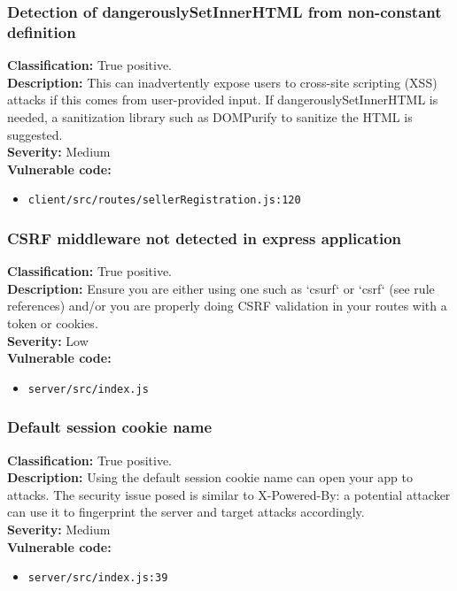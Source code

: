 \documentclass[]{article}
\begin{document}
\subsubsection{Detection of dangerouslySetInnerHTML from non-constant definition}
\textbf{Classification:} {True positive.} \\
\textbf{Description:} This can inadvertently expose users to cross-site scripting (XSS) attacks if this comes from user-provided input. If dangerouslySetInnerHTML is needed, a sanitization library such as DOMPurify to sanitize the HTML is suggested. \\ 
\textbf{Severity:}  Medium \\ 
\textbf{Vulnerable code:}
\begin{itemize}
    \item \texttt{client/src/routes/sellerRegistration.js:120}
\end{itemize}

\subsubsection{CSRF middleware not detected in express application}
\textbf{Classification:} {True positive.} \\
\textbf{Description:}  Ensure you are either using one such
          as `csurf` or `csrf` (see rule references) and/or you are properly doing CSRF validation in your    
          routes with a token or cookies.\\ 
\textbf{Severity:}  Low \\ 
\textbf{Vulnerable code:}
\begin{itemize}
    \item \texttt{server/src/index.js}
\end{itemize}


\subsubsection{Default session cookie name}
\textbf{Classification:} {True positive.} \\
\textbf{Description:} Using the default session cookie name can open your app to
          attacks. The security issue posed is similar to X-Powered-By: a potential attacker can use it to    
          fingerprint the server and target attacks accordingly. \\ 
\textbf{Severity:}  Medium \\ 
\textbf{Vulnerable code:}
\begin{itemize}
    \item \texttt{server/src/index.js:39}
\end{itemize}
\end{document}
